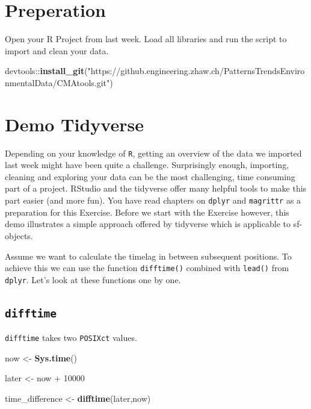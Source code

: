 \documentclass[]{book}
\newenvironment{Shaded}{\begin{snugshade}}{\end{snugshade}}
\newcommand{\KeywordTok}[1]{\textcolor[rgb]{0.13,0.29,0.53}{\textbf{{#1}}}}
\newcommand{\DecValTok}[1]{\textcolor[rgb]{0.00,0.00,0.81}{{#1}}}
\newcommand{\StringTok}[1]{\textcolor[rgb]{0.31,0.60,0.02}{{#1}}}
\newcommand{\NormalTok}[1]{{#1}}
\theoremstyle{definition}
\theoremstyle{definition}
\theoremstyle{definition}
\theoremstyle{remark}
\begin{document}
\section{Preperation}\label{preperation-1}

Open your R Project from last week. Load all libraries and run the
script to import and clean your data.

\begin{Shaded}
\begin{Highlighting}[]

\NormalTok{devtools::}\KeywordTok{install_git}\NormalTok{(}\StringTok{"https://github.engineering.zhaw.ch/PatternsTrendsEnvironmentalData/CMAtools.git"}\NormalTok{)}
\end{Highlighting}
\end{Shaded}

\section{Demo Tidyverse}\label{demo-tidyverse}

Depending on your knowledge of \texttt{R}, getting an overview of the
data we imported last week might have been quite a challenge.
Surprisingly enough, importing, cleaning and exploring your data can be
the most challenging, time consuming part of a project. RStudio and the
tidyverse offer many helpful tools to make this part easier (and more
fun). You have read chapters on \texttt{dplyr} and \texttt{magrittr} as
a preparation for this Exercise. Before we start with the Exercise
however, this demo illustrates a simple approach offered by tidyverse
which is applicable to sf-objects.

Assume we want to calculate the timelag in between subsequent positions.
To achieve this we can use the function \texttt{difftime()} combined
with \texttt{lead()} from \texttt{dplyr}. Let's look at these functions
one by one.

\subsection{\texorpdfstring{\texttt{difftime}}{difftime}}\label{difftime}

\texttt{difftime} takes two \texttt{POSIXct} values.

\begin{Shaded}
\begin{Highlighting}[]
\NormalTok{now <-}\StringTok{ }\KeywordTok{Sys.time}\NormalTok{()}

\NormalTok{later <-}\StringTok{ }\NormalTok{now +}\StringTok{ }\DecValTok{10000}

\NormalTok{time_difference <-}\StringTok{ }\KeywordTok{difftime}\NormalTok{(later,now)}
\end{Highlighting}
\end{Shaded}
\end{document}
